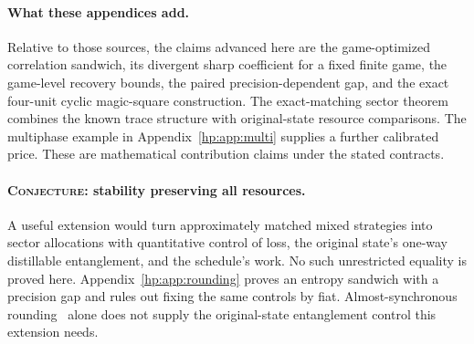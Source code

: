 \paragraph{What these appendices add.}
Relative to those sources, the claims advanced here are the game-optimized correlation sandwich, its divergent sharp coefficient for a fixed finite game, the game-level recovery bounds, the paired precision-dependent gap, and the exact four-unit cyclic magic-square construction. The exact-matching sector theorem combines the known trace structure with original-state resource comparisons. The multiphase example in Appendix~\ref{hp:app:multi} supplies a further calibrated price. These are mathematical contribution claims under the stated contracts.

\paragraph{\textnormal{\textsc{Conjecture}}: stability preserving all resources.}
A useful extension would turn approximately matched mixed strategies into sector allocations with quantitative control of loss, the original state's one-way distillable entanglement, and the schedule's work. No such unrestricted equality is proved here. Appendix~\ref{hp:app:rounding} proves an entropy sandwich with a precision gap and rules out fixing the same controls by fiat. Almost-synchronous rounding~\cite{HPvidick} alone does not supply the original-state entanglement control this extension needs.
